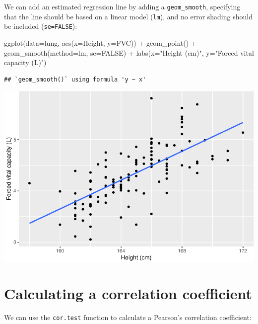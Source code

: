 \documentclass[
]{memoir}
\newenvironment{Shaded}{\begin{snugshade}}{\end{snugshade}}
\newcommand{\AttributeTok}[1]{\textcolor[rgb]{0.77,0.63,0.00}{#1}}
\newcommand{\ConstantTok}[1]{\textcolor[rgb]{0.00,0.00,0.00}{#1}}
\newcommand{\FunctionTok}[1]{\textcolor[rgb]{0.00,0.00,0.00}{#1}}
\newcommand{\NormalTok}[1]{#1}
\newcommand{\SpecialCharTok}[1]{\textcolor[rgb]{0.00,0.00,0.00}{#1}}
\newcommand{\StringTok}[1]{\textcolor[rgb]{0.31,0.60,0.02}{#1}}
\begin{document}
We can add an estimated regression line by adding a \texttt{geom\_smooth}, specifying that the line should be based on a linear model (\texttt{lm}), and no error shading should be included (\texttt{se=FALSE}):

\begin{Shaded}
\begin{Highlighting}[]
\FunctionTok{ggplot}\NormalTok{(}\AttributeTok{data=}\NormalTok{lung, }\FunctionTok{aes}\NormalTok{(}\AttributeTok{x=}\NormalTok{Height, }\AttributeTok{y=}\NormalTok{FVC)) }\SpecialCharTok{+} 
  \FunctionTok{geom\_point}\NormalTok{() }\SpecialCharTok{+}
  \FunctionTok{geom\_smooth}\NormalTok{(}\AttributeTok{method=}\NormalTok{lm, }\AttributeTok{se=}\ConstantTok{FALSE}\NormalTok{) }\SpecialCharTok{+}
  \FunctionTok{labs}\NormalTok{(}\AttributeTok{x=}\StringTok{"Height (cm)"}\NormalTok{, }\AttributeTok{y=}\StringTok{"Forced vital capacity (L)"}\NormalTok{)}
\end{Highlighting}
\end{Shaded}

\begin{verbatim}
## `geom_smooth()` using formula 'y ~ x'
\end{verbatim}

\includegraphics{phcm9795-R-notes_files/figure-latex/unnamed-chunk-96-1.pdf}

\hypertarget{calculating-a-correlation-coefficient}{%
\section{Calculating a correlation coefficient}\label{calculating-a-correlation-coefficient}}

We can use the \texttt{cor.test} function to calculate a Pearson's correlation coefficient:
\end{document}
